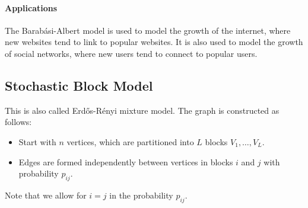 \documentclass{article}
\begin{document}
\paragraph{Applications}
    The Barab\'{a}si-Albert model is used to model the growth of the internet, where new websites tend to link to popular websites. It is also used to model the growth of social networks, where new users tend to connect to popular users.

\subsection{Stochastic Block Model}

This is also called Erd\H{o}s-R\'{e}nyi mixture model. The graph is constructed as follows:
\begin{itemize}
    \item Start with $n$ vertices, which are partitioned into $L$ blocks $V_1,\ldots,V_L$.
    \item Edges are formed independently between vertices in blocks $i$ and $j$ with probability $p_{ij}$.
\end{itemize}
\begin{remark}
    Note that we allow for $i=j$ in the probability $p_{ij}$. 
\end{remark}
\end{document}
